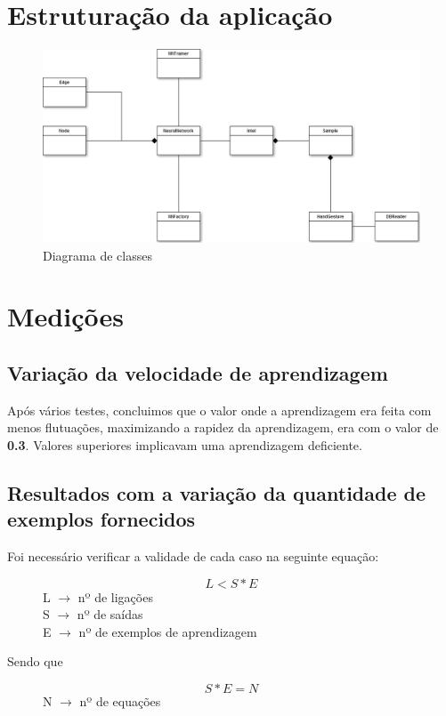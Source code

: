 \documentclass[10pt,a4paper]{article}
\begin{document}
\section{Estruturação da aplicação}
\begin{figure}[here]
\centering
\includegraphics[scale=0.33]{iart_nn.png}
\caption{Diagrama de classes}
\end{figure}

\section{Medições}

\subsection{Variação da velocidade de aprendizagem}

Após vários testes, concluimos que o valor onde a aprendizagem era feita com menos flutuações, maximizando a rapidez da aprendizagem, era com o valor de \textbf{0.3}. Valores superiores implicavam uma aprendizagem deficiente.

\subsection{Resultados com a variação da quantidade de exemplos fornecidos}

Foi necessário verificar a validade de cada caso na seguinte equação:

\begin{figure}[here]
\centering
\[L<S*E\]
L $\rightarrow$ nº de ligações \\ S $\rightarrow$ nº de saídas \\ E $\rightarrow$ nº de exemplos de aprendizagem
\end{figure}

Sendo que 
\begin{figure}[here]
\centering
\[S*E = N\]
N $\rightarrow$ nº de equações
\end{figure}
\end{document}
